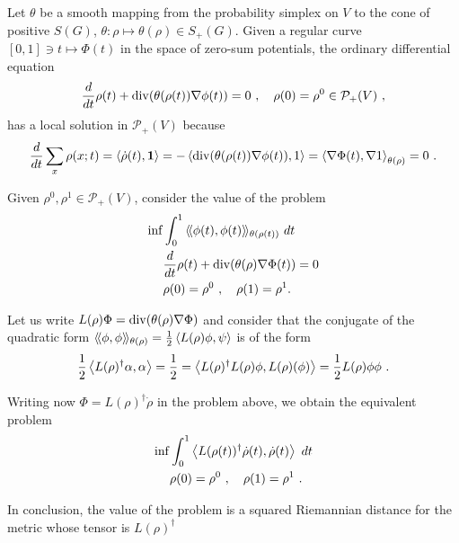 \documentclass[12pt,a4paper]{amsart}
\begin{document}
Let $\theta$ be a smooth mapping from the probability simplex on $V$ to the
cone of positive $S(G)$, $\theta \colon \rho \mapsto \theta(\rho) \in
S_+(G)$. Given a regular curve $[0,1] \ni t \mapsto \Phi(t)$ in the
space of zero-sum potentials, the ordinary differential equation
\begin{equation*}
  \derivby t \rho(t) +  \Div(\theta(\rho(t))\nabla \phi(t)) = 0 \ , \quad
  \rho(0) = \rho^0 \in \mathcal P_+(V) \ ,
\end{equation*}
has a local solution in $\mathcal P_+(V)$ because
\begin{equation*}
  \derivby t \sum_x \rho(x;t) = \scalarof {\dot \rho(t)}{\one} = 
 - \scalarof {\Div(\theta(\rho(t))\nabla \phi(t))}{1} = \scalarat
 {\theta(\rho)} {\nabla \Phi(t)}{\nabla 1}
 = 0 \ .
\end{equation*}

Given $\rho^0, \rho^1 \in \mathcal P_+(V)$, consider the value of the problem
\begin{align*}
 \inf &\int_0^1 \Scalarat {\theta(\rho(t))} {\phi(t)}{\phi(t)} \ dt
 \\
 &\derivby t \rho(t) +  \Div(\theta(\rho)\nabla \Phi(t)) = 0 \\
 &\rho(0) = \rho^0 \ , \quad \rho(1) = \rho^1.
\end{align*}

Let us write $L(\rho)\Phi = \Div(\theta(\rho)\nabla \Phi)$ and
consider that the conjugate of the quadratic form
$\Scalarat {\theta(\rho)} \phi \phi = \frac 12 \scalarof {L(\rho)\phi}
\psi$ is of the form
\begin{equation*}
  \frac 12 \scalarof {L(\rho)^\dagger \alpha} {\alpha} = \frac12 =
  \scalarof {L(\rho)^\dagger L(\rho) \phi} {L(\rho)(\phi)} = \frac12
  {L(\rho) \phi} \phi \ . 
\end{equation*}

Writing now $\Phi = L(\rho)^\dagger \dot \rho$ in the problem above,
we obtain the equivalent problem
\begin{align*}
 \inf &\int_0^1 \scalarof {L(\rho(t))^\dagger \dot \rho(t)}{\dot \rho(t)} \ dt
 \\
 &\rho(0) = \rho^0 \ , \quad \rho(1) = \rho^1 \ .
\end{align*}

In conclusion, the value of the problem is a squared Riemannian
distance for the metric whose tensor is $L(\rho)^\dagger$
\end{document}
